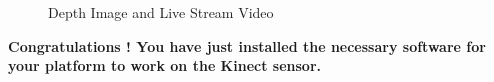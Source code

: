 \begin{flushleft}
\begin{figure}
\begin{center}
\end{center}
\caption{Depth Image and Live Stream Video}
\label{fig:w21}
\end{figure}

\Large{\textbf{Congratulations ! You have just installed the necessary software for your platform to work on the Kinect sensor.}}


\end{flushleft}

